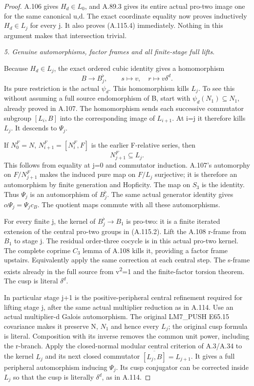 \begin{proof}
A.106 gives \(H_d\in L_0\), and A.89.3 gives its entire actual pro-two image one for the same canonical u,d. The exact coordinate equality now proves inductively \(H_d\in L_j\) for every j. It also proves (A.115.4) immediately. Nothing in this argument makes that intersection trivial.

\medskip\noindent\emph{5. Genuine automorphisms, factor frames and all finite-stage full lifts}.

Because \(H_d\in L_j\), the exact ordered cubic identity gives a homomorphism
\[
B\to B_j^\flat,\qquad s\mapsto v,\quad r\mapsto v\delta^d.
\]
Its pure restriction is the actual \(\psi_d\). This homomorphism kills \(L_j\). To see this without assuming a full source endomorphism of B, start with \(\psi_d(N_1)\subseteq N_1\), already proved in A.107. The homomorphism sends each successive commutator subgroup \([L_i,B]\) into the corresponding image of \(L_{i+1}\). At i=j it therefore kills \(L_j\). It descends to \(\Psi_j\).

If \(N^{F}_0=N\), \(N^{F}_{i+1}=[N^{F}_i,F]\) is the earlier F-relative series, then
\[
N^{F}_{j+1}\subseteq L_j.
\]
This follows from equality at j=0 and commutator induction. A.107's automorphy on \(F/N^{F}_{j+1}\) makes the induced pure map on \(F/L_j\) surjective; it is therefore an automorphism by finite generation and Hopficity. The map on \(S_3\) is the identity. Thus \(\Psi_j\) is an automorphism of \(B_j^\flat\). The same actual generator identity gives \(\alpha\Psi_j=\Psi_jc_B\). The quotient maps commute with all these automorphisms.

For every finite j, the kernel of \(B_j^\flat\to B_1\) is pro-two: it is a finite iterated extension of the central pro-two groups in (A.115.2). Lift the A.108 r-frame from \(B_1\) to stage j. The residual order-three cocycle is in this actual pro-two kernel. The complete coprime \(C_3\) lemma of A.108 kills it, providing a factor frame upstairs. Equivalently apply the same correction at each central step. The s-frame exists already in the full source from v\textsuperscript{2}=1 and the finite-factor torsion theorem. The cusp is literal \(\delta^d\).

In particular stage j+1 is the positive-peripheral central refinement required for lifting stage j, after the same actual multiplier reduction as in A.114. Use an actual multiplier-d Galois automorphism. The original LM7\_PUSH E65.15 covariance makes it preserve N, \(N_1\) and hence every \(L_j\); the original cusp formula is literal. Composition with its inverse removes the common unit power, including the r-branch. Apply the closed-normal modular central criterion of A.3/A.34 to the kernel \(L_j\) and its next closed commutator \(\overline{[L_j,B]}=L_{j+1}\). It gives a full peripheral automorphism inducing \(\Psi_j\). Its cusp conjugator can be corrected inside \(L_j\) so that the cusp is literally \(\delta^d\), as in A.114.


\end{proof}
